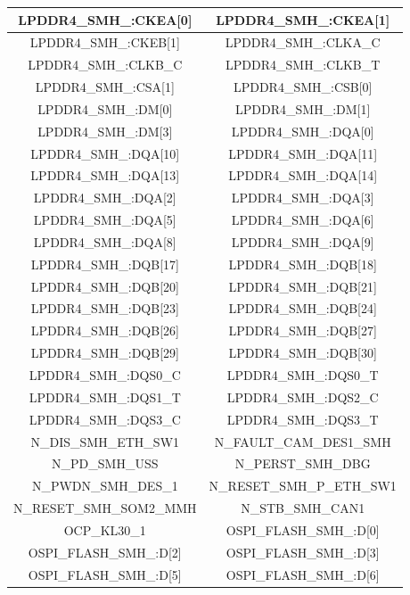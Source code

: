 \begin{center}
\begin{longtable}{|c|c|}
    LPDDR4\_SMH\_:CKEA[0] & LPDDR4\_SMH\_:CKEA[1] \\ \hline 
    LPDDR4\_SMH\_:CKEB[1] & LPDDR4\_SMH\_:CLKA\_C \\ \hline 
    LPDDR4\_SMH\_:CLKB\_C & LPDDR4\_SMH\_:CLKB\_T \\ \hline 
    LPDDR4\_SMH\_:CSA[1] & LPDDR4\_SMH\_:CSB[0] \\ \hline 
    LPDDR4\_SMH\_:DM[0] & LPDDR4\_SMH\_:DM[1] \\ \hline 
    LPDDR4\_SMH\_:DM[3] & LPDDR4\_SMH\_:DQA[0] \\ \hline 
    LPDDR4\_SMH\_:DQA[10] & LPDDR4\_SMH\_:DQA[11] \\ \hline 
    LPDDR4\_SMH\_:DQA[13] & LPDDR4\_SMH\_:DQA[14] \\ \hline 
    LPDDR4\_SMH\_:DQA[2] & LPDDR4\_SMH\_:DQA[3] \\ \hline 
    LPDDR4\_SMH\_:DQA[5] & LPDDR4\_SMH\_:DQA[6] \\ \hline 
    LPDDR4\_SMH\_:DQA[8] & LPDDR4\_SMH\_:DQA[9] \\ \hline 
    LPDDR4\_SMH\_:DQB[17] & LPDDR4\_SMH\_:DQB[18] \\ \hline 
    LPDDR4\_SMH\_:DQB[20] & LPDDR4\_SMH\_:DQB[21] \\ \hline 
    LPDDR4\_SMH\_:DQB[23] & LPDDR4\_SMH\_:DQB[24] \\ \hline 
    LPDDR4\_SMH\_:DQB[26] & LPDDR4\_SMH\_:DQB[27] \\ \hline 
    LPDDR4\_SMH\_:DQB[29] & LPDDR4\_SMH\_:DQB[30] \\ \hline 
    LPDDR4\_SMH\_:DQS0\_C & LPDDR4\_SMH\_:DQS0\_T \\ \hline 
    LPDDR4\_SMH\_:DQS1\_T & LPDDR4\_SMH\_:DQS2\_C \\ \hline 
    LPDDR4\_SMH\_:DQS3\_C & LPDDR4\_SMH\_:DQS3\_T \\ \hline 
    N\_DIS\_SMH\_ETH\_SW1 & N\_FAULT\_CAM\_DES1\_SMH \\ \hline 
    N\_PD\_SMH\_USS & N\_PERST\_SMH\_DBG \\ \hline 
    N\_PWDN\_SMH\_DES\_1 & N\_RESET\_SMH\_P\_ETH\_SW1 \\ \hline 
    N\_RESET\_SMH\_SOM2\_MMH & N\_STB\_SMH\_CAN1 \\ \hline 
    OCP\_KL30\_1 & OSPI\_FLASH\_SMH\_:D[0] \\ \hline 
    OSPI\_FLASH\_SMH\_:D[2] & OSPI\_FLASH\_SMH\_:D[3] \\ \hline 
    OSPI\_FLASH\_SMH\_:D[5] & OSPI\_FLASH\_SMH\_:D[6] \\ \hline 

\end{longtable}
\end{center}
